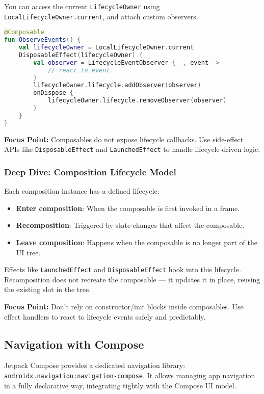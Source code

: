\documentclass[a4paper,12pt]{article}
\begin{document}
You can access the current \texttt{LifecycleOwner} using \texttt{LocalLifecycleOwner.current}, and attach custom observers.

\begin{lstlisting}[language=Kotlin]
@Composable
fun ObserveEvents() {
    val lifecycleOwner = LocalLifecycleOwner.current
    DisposableEffect(lifecycleOwner) {
        val observer = LifecycleEventObserver { _, event -> 
            // react to event
        }
        lifecycleOwner.lifecycle.addObserver(observer)
        onDispose {
            lifecycleOwner.lifecycle.removeObserver(observer)
        }
    }
}
\end{lstlisting}

\textbf{Focus Point:} Composables do not expose lifecycle callbacks. Use side-effect APIs like \texttt{DisposableEffect} and \texttt{LaunchedEffect} to handle lifecycle-driven logic.

\subsubsection{Deep Dive: Composition Lifecycle Model}

Each composition instance has a defined lifecycle:

\begin{itemize}
  \item \textbf{Enter composition}: When the composable is first invoked in a frame.
  \item \textbf{Recomposition}: Triggered by state changes that affect the composable.
  \item \textbf{Leave composition}: Happens when the composable is no longer part of the UI tree.
\end{itemize}

Effects like \texttt{LaunchedEffect} and \texttt{DisposableEffect} hook into this lifecycle. Recomposition does not recreate the composable — it updates it in place, reusing the existing slot in the tree.

\textbf{Focus Point:} Don’t rely on constructor/init blocks inside composables. Use effect handlers to react to lifecycle events safely and predictably.

\subsection{Navigation with Compose}

Jetpack Compose provides a dedicated navigation library: \texttt{androidx.navigation:navigation-compose}. It allows managing app navigation in a fully declarative way, integrating tightly with the Compose UI model.
\end{document}
